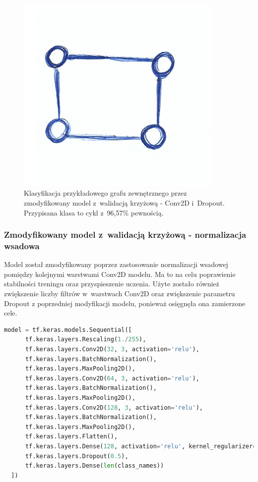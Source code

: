 \begin{figure}[ht]
	\centering
	\includegraphics[width=10cm]{../graph_classification/test_graphs/drawn/cycle-6.png}
	\caption{Klasyfikacja przykładowego grafu zewnętrznego przez zmodyfikowany model z~walidacją krzyżową - Conv2D i~Dropout.
		Przypisana klasa to cykl z~96,57\% pewnością.}
	\label{Fig:tests-cv-1d}
\end{figure}
\FloatBarrier

\subsubsection{Zmodyfikowany model z~walidacją krzyżową - normalizacja wsadowa}

Model został zmodyfikowany poprzez zastosowanie normalizacji wsadowej pomiędzy kolejnymi warstwami Conv2D modelu.
Ma to na celu poprawienie stabilności treningu oraz przyspieszenie uczenia.
Użyte zostało również zwiększenie liczby filtrów w~warstwach Conv2D oraz zwiększenie parametru Dropout
z poprzedniej modyfikacji modelu, ponieważ osięgnęła ona zamierzone cele.

\begin{lstlisting}[language=Python,caption=Listing zmodyfikowanego skryptu tworzącego model z~walidacją krzyżową - wersja 2,
	label={tests-model-crossval2}]
	model = tf.keras.models.Sequential([
      tf.keras.layers.Rescaling(1./255),
      tf.keras.layers.Conv2D(32, 3, activation='relu'),
      tf.keras.layers.BatchNormalization(),
      tf.keras.layers.MaxPooling2D(),
      tf.keras.layers.Conv2D(64, 3, activation='relu'),
      tf.keras.layers.BatchNormalization(),
      tf.keras.layers.MaxPooling2D(),
      tf.keras.layers.Conv2D(128, 3, activation='relu'),
      tf.keras.layers.BatchNormalization(),
      tf.keras.layers.MaxPooling2D(),
      tf.keras.layers.Flatten(),
      tf.keras.layers.Dense(128, activation='relu', kernel_regularizer=tf.keras.regularizers.l2(0.01)),
      tf.keras.layers.Dropout(0.5),
      tf.keras.layers.Dense(len(class_names))
  ])
\end{lstlisting}

